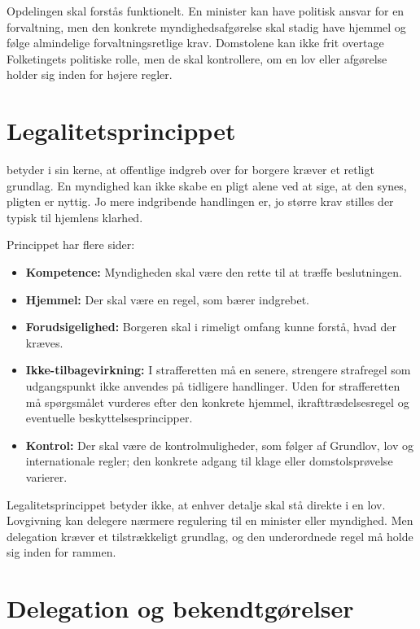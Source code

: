 Opdelingen skal forstås funktionelt. En minister kan have politisk ansvar for en forvaltning, men den konkrete myndighedsafgørelse skal stadig have hjemmel og følge almindelige forvaltningsretlige krav. Domstolene kan ikke frit overtage Folketingets politiske rolle, men de skal kontrollere, om en lov eller afgørelse holder sig inden for højere regler.

\section{Legalitetsprincippet}

 betyder i sin kerne, at offentlige indgreb over for borgere kræver et retligt grundlag. En myndighed kan ikke skabe en pligt alene ved at sige, at den synes, pligten er nyttig. Jo mere indgribende handlingen er, jo større krav stilles der typisk til hjemlens klarhed.

Princippet har flere sider:
\begin{itemize}
  \item \textbf{Kompetence:} Myndigheden skal være den rette til at træffe beslutningen.
  \item \textbf{Hjemmel:} Der skal være en regel, som bærer indgrebet.
  \item \textbf{Forudsigelighed:} Borgeren skal i rimeligt omfang kunne forstå, hvad der kræves.
  \item \textbf{Ikke-tilbagevirkning:} I strafferetten må en senere, strengere strafregel som udgangspunkt ikke anvendes på tidligere handlinger. Uden for strafferetten må spørgsmålet vurderes efter den konkrete hjemmel, ikrafttrædelsesregel og eventuelle beskyttelsesprincipper.
  \item \textbf{Kontrol:} Der skal være de kontrolmuligheder, som følger af Grundlov, lov og internationale regler; den konkrete adgang til klage eller domstolsprøvelse varierer.
\end{itemize}

Legalitetsprincippet betyder ikke, at enhver detalje skal stå direkte i en lov. Lovgivning kan delegere nærmere regulering til en minister eller myndighed. Men delegation kræver et tilstrækkeligt grundlag, og den underordnede regel må holde sig inden for rammen.

\section{Delegation og bekendtgørelser}

